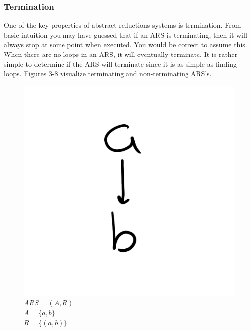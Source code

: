 \documentclass{article}
\begin{document}
\subsubsection{Termination}

\medskip\noindent
One of the key properties of abstract reductions systems is termination. From basic intuition you may have guessed that if an ARS is terminating, then it will always stop at some point when executed. You would be correct to assume this. When there are no loops in an ARS, it will eventually terminate. It is rather simple to determine if the ARS will terminate since it is as simple as finding loops. Figures 3-8 visualize terminating and non-terminating ARS’s.

\begin{figure}[H]
  \centering
  \includegraphics[scale=0.06]{gen3}
  \caption[] {
    $ARS = (A, R)$
    \\ $A=\{a,b\}$
    \\ $R=\{(a,b)\}$
    \endtabular}
\end{figure}
\end{document}
